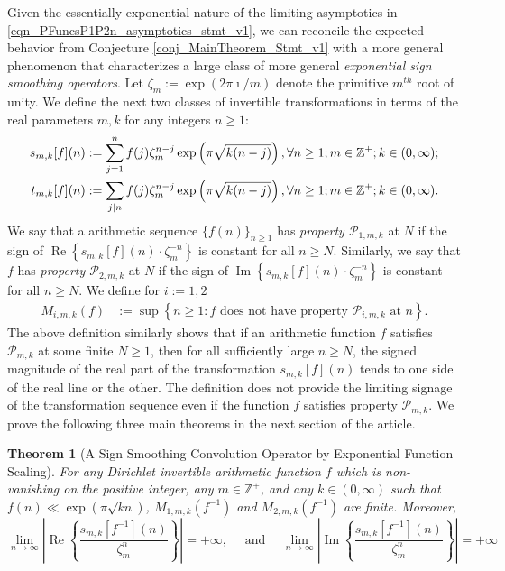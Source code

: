\documentclass[11pt,reqno]{amsart}
\numberwithin{figure}{section}
\numberwithin{table}{section}
\renewcommand{\Re}{\operatorname{Re}}
\renewcommand{\Im}{\operatorname{Im}}
\theoremstyle{plain}
\newtheorem{theorem}{Theorem}
\numberwithin{theorem}{section}
\theoremstyle{definition}
\begin{document}
Given the essentially exponential nature of the limiting asymptotics in 
\eqref{eqn_PFuncsP1P2n_asymptotics_stmt_v1}, we can reconcile the expected behavior 
from Conjecture \ref{conj_MainTheorem_Stmt_v1} with a more general phenomenon that 
characterizes a large class of more general \emph{exponential sign smoothing operators}. 
Let $\zeta_m := \exp(2\pi\imath / m)$ denote the primitive $m^{th}$ root of unity. 
We define the next two classes of invertible transformations in terms of the 
real parameters $m,k$ for any integers $n \geq 1$: 
\begin{align} 
\label{eqn_sfn_tfn_SignSmoothingByExpFuncSumsFuncs_intro_v1}
s_{m,k}[f](n) & := \sum_{j=1}^{n} f(j) \zeta_m^{n-j} \exp\left(\pi \sqrt{k(n-j)}\right), 
     \forall n \geq 1; m \in \mathbb{Z}^{+}; k \in (0, \infty); \\ 
\notag 
t_{m,k}[f](n) & := \sum_{j|n} f(j) \zeta_m^{n-j} \exp\left(\pi \sqrt{k(n-j)}\right), 
     \forall n \geq 1; m \in \mathbb{Z}^{+}; k \in (0, \infty).
\end{align} 
We say that a arithmetic sequence $\{f(n)\}_{n \geq 1}$ has 
\emph{property $\mathcal{P}_{1,m,k}$} at $N$ if the sign of $\Re\left\{s_{m,k}[f](n) \cdot \zeta_m^{-n}\right\}$ 
is constant for all $n \geq N$. Similarly, we say that $f$ has 
\emph{property $\mathcal{P}_{2,m,k}$} at $N$ if the sign of $\Im\left\{s_{m,k}[f](n) \cdot \zeta_m^{-n}\right\}$ 
is constant for all $n \geq N$. 
We define for $i := 1,2$ 
\begin{align*} 
M_{i,m,k}(f) & := \sup \left\{n \geq 1: f \text{\ does not have property\ } \mathcal{P}_{i,m,k} \text{\ at\ } n\right\}. 
\end{align*} 
The above definition similarly shows that if an arithmetic function $f$ 
satisfies $\mathcal{P}_{m,k}$ at some finite $N \geq 1$, then 
for all sufficiently large $n \geq N$, the signed magnitude of the real part of the transformation 
$s_{m,k}[f](n)$ tends to one side of the real line or the other. 
The definition does not provide the limiting signage of the 
transformation sequence even if the function $f$ satisfies property $\mathcal{P}_{m,k}$. 
We prove the following three main theorems in the next section of the article. 

\begin{theorem}[A Sign Smoothing Convolution Operator by Exponential Function Scaling] 
\label{theorem_MainTheorem_Stmt_v1} 
For any Dirichlet invertible arithmetic function $f$ which is non-vanishing on the positive integer, 
any $m \in \mathbb{Z}^{+}$, and any $k \in (0, \infty)$ such that 
$f(n) \ll \exp(\pi\sqrt{kn})$, $M_{1,m,k}(f^{-1})$ and $M_{2,m,k}(f^{-1})$ are finite. Moreover, 
\[
\lim_{n \rightarrow \infty} \left\lvert \Re\left\{\frac{s_{m,k}[f^{-1}](n)}{\zeta_m^n}\right\} \right\rvert = +\infty, 
     \quad\text{ and }\quad 
\lim_{n \rightarrow \infty} \left\lvert \Im\left\{\frac{s_{m,k}[f^{-1}](n)}{\zeta_m^n}\right\} \right\rvert = +\infty
\]
\end{theorem} 
\end{document}
